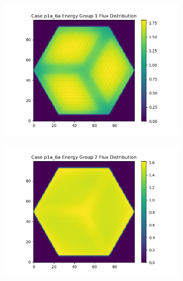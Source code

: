 \documentclass[letterpaper,11pt]{report}
\begin{document}
\begin{figure}[H]
            \begin{subfigure}{.33\textwidth}
              \centering
              \includegraphics[width=1.1\linewidth]{../../phase1a/case6a/analysis_output/p1a_6a_e_eg1.png}
              \caption{}
            \end{subfigure}%
            \begin{subfigure}{.33\textwidth}
              \centering
              \includegraphics[width=1.1\linewidth]{../../phase1a/case6a/analysis_output/p1a_6a_e_eg2.png}
              \caption{}
            \end{subfigure}
            \begin{subfigure}{.33\textwidth}
              \centering

\end{subfigure}
\end{figure}
\end{document}
